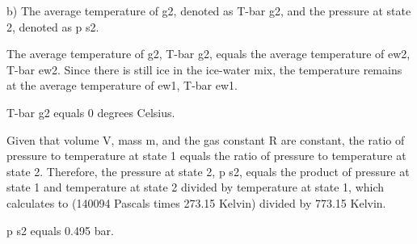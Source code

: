 b) The average temperature of g2, denoted as T-bar g2, and the pressure at state 2, denoted as p s2.

The average temperature of g2, T-bar g2, equals the average temperature of ew2, T-bar ew2. Since there is still ice in the ice-water mix, the temperature remains at the average temperature of ew1, T-bar ew1.

T-bar g2 equals 0 degrees Celsius.

Given that volume V, mass m, and the gas constant R are constant, the ratio of pressure to temperature at state 1 equals the ratio of pressure to temperature at state 2. Therefore, the pressure at state 2, p s2, equals the product of pressure at state 1 and temperature at state 2 divided by temperature at state 1, which calculates to (140094 Pascals times 273.15 Kelvin) divided by 773.15 Kelvin.

p s2 equals 0.495 bar.